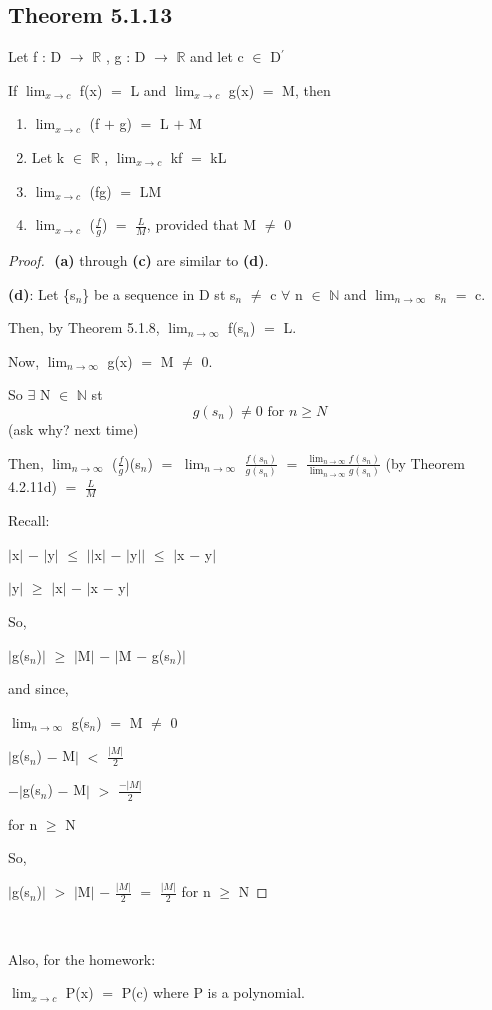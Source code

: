 \documentclass{article}
\newcommand{\mt}[1]{\ensuremath{#1}}
\newcommand\ssc[2][\DefaultOpt]{%
  \def\DefaultOpt{#2}%
  \subsection[#1]{#2}%
}
\newcommand{\bgpf}{\begin{proof} $ $\newline}
\newcommand{\balist}{\begin{enumerate}[label=\alph*.]}
\newcommand{\elist}{\end{enumerate}}
\newcommand{\bpth}[1]{\textbf{(#1)}}
\newcommand{\epf}{\end{proof}}
\newcommand{\br}{\mt{\mathbb{R}} }       %
\newcommand{\bn}{\mt{\mathbb{N}} }       %
\newcommand{\fa}{\mt{\forall} }          %
\newcommand{\mem}{\mt{\in} }
\newcommand{\exs}{\mt{\exists} }
\newcommand{\lra}{ \mt{\longrightarrow} } %
\newcommand{\av}[1]{\mt{|}#1\mt{|}}  %
\newcommand{\bk}[1]{\{#1\}}
\newcommand{\ps}{\mt{+} }
\newcommand{\ms}{\mt{-} }
\newcommand{\ls}{\mt{<} }
\newcommand{\gr}{\mt{>} }
\newcommand{\lse}{\mt{\leq} }
\newcommand{\gre}{\mt{\geq} }
\newcommand{\eql}{\mt{=} }
\newcommand{\pr}{\mt{^\prime} } 		   %
\newcommand{\uw}[2]{#1\mt{_{#2}}}
\newcommand{\frc}[2]{\mt{\frac{#1}{#2}}}
\newcommand{\lmti}[1]{\mt{\displaystyle{\lim_{#1 \to \infty}}}}
\newcommand{\limt}[2]{\mt{\displaystyle{\lim_{#1 \to #2}}}}
\newcommand{\eqn}[1]{\[#1\]}
\begin{document}
{\newpage

\ssc{Theorem 5.1.13}{

Let f : D \lra \br, g : D \lra \br and let c \mem D\pr

If \limt{x}{c} f(x) \eql L and \limt{x}{c} g(x) \eql M, then

\balist
\item \limt{x}{c} (f \ps g) \eql L \ps M
\item Let k \mem \br, \limt{x}{c} kf \eql kL
\item \limt{x}{c} (fg) \eql LM
\item \limt{x}{c} (\frc{f}{g}) \eql \frc{L}{M}, provided that M $\neq$ 0
\elist

\bgpf
\bpth{a} through \bpth{c} are similar to \bpth{d}.

\bpth{d}: Let \bk{\uw{s}{n}} be a sequence in D st \uw{s}{n} $\neq$ c \fa n \mem \bn and \lmti{n} \uw{s}{n} \eql c.

Then, by Theorem 5.1.8, \lmti{n} f(\uw{s}{n}) \eql L.

Now, \lmti{n} g(x) \eql M $\neq$ 0.

So \exs N \mem \bn st
\eqn{g(s_n) \neq 0 \textrm{ for } n \gre N}
(ask why? next time)

Then, \lmti{n} (\frc{f}{g})(\uw{s}{n}) \eql \lmti{n} \frc{f(s_n)}{g(s_n)} \eql \frc{\lmti{n} f(s_n)}{\lmti{n} g(s_n)} (by Theorem 4.2.11d) \eql \frc{L}{M}

Recall:

\av{x} \ms \av{y} \lse \av{\av{x} \ms \av{y}} \lse \av{x \ms y}

\av{y} \gre \av{x} \ms \av{x \ms y}

So,

\av{g(\uw{s}{n})} \gre \av{M} \ms \av{M \ms g(\uw{s}{n})}

and since,

\lmti{n} g(\uw{s}{n}) \eql M $\neq$ 0

\av{g(\uw{s}{n}) \ms M} \ls \frc{\av{M}}{2}

$-$\av{g(\uw{s}{n}) \ms M} \gr \frc{-\av{M}}{2}

for n \gre N

So,

\av{g(\uw{s}{n})} \gr \av{M} \ms \frc{\av{M}}{2} \eql \frc{\av{M}}{2} for n \gre N 
\epf 
}

\

Also, for the homework:

\limt{x}{c} P(x) \eql P(c) where P is a polynomial.
}
\end{document}
